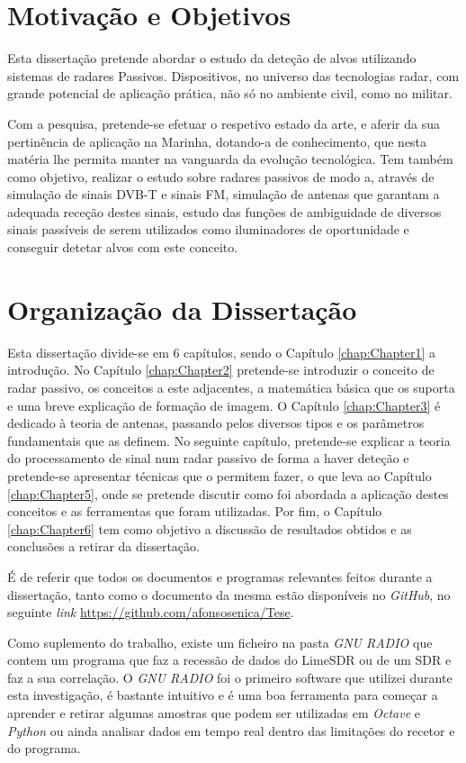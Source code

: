 \section{Motivação e Objetivos}
Esta dissertação pretende abordar o estudo da deteção de alvos utilizando sistemas de radares Passivos. Dispositivos, no universo das tecnologias radar, com grande potencial de aplicação prática, não só no ambiente civil, como no militar.\par
Com a pesquisa, pretende-se efetuar o respetivo estado da arte, e aferir da sua pertinência de aplicação na Marinha, dotando-a de conhecimento, que nesta matéria lhe permita manter na vanguarda da evolução tecnológica. Tem também como objetivo, realizar o estudo sobre radares passivos de modo a, através de simulação de sinais \gls{DVB-T} e sinais \gls{FM}, simulação de antenas que garantam a adequada receção destes sinais, estudo das funções de ambiguidade de diversos sinais passíveis de serem utilizados como iluminadores de oportunidade e conseguir detetar alvos com este conceito. 

\section{Organização da Dissertação}
Esta dissertação divide-se em 6 capítulos, sendo o Capítulo \ref{chap:Chapter1} a introdução. No Capítulo \ref{chap:Chapter2} pretende-se introduzir o conceito de radar passivo, os conceitos a este adjacentes, a matemática básica que os suporta e uma breve explicação de formação de imagem. O Capítulo \ref{chap:Chapter3} é dedicado à teoria de antenas, passando pelos diversos tipos e os parâmetros fundamentais que as definem. No seguinte capítulo, pretende-se explicar a teoria do processamento de sinal num radar passivo de forma a haver deteção e pretende-se apresentar técnicas que o permitem fazer, o que leva ao Capítulo \ref{chap:Chapter5}, onde se pretende discutir como foi abordada a aplicação destes conceitos e as ferramentas que foram utilizadas. Por fim, o Capítulo \ref{chap:Chapter6} tem como objetivo a discussão de resultados obtidos e as conclusões a retirar da dissertação.\par 
É de referir que todos os documentos e programas relevantes feitos durante a dissertação, tanto como o documento da mesma estão disponíveis no \textit{GitHub}, no seguinte \textit{link} \url{https://github.com/afonsosenica/Tese}.\par 
Como suplemento do trabalho, existe um ficheiro na pasta \textit{GNU RADIO} que contem um programa que faz a recessão de dados do LimeSDR ou de um \gls{SDR} e faz a sua correlação. O \textit{GNU RADIO} foi o primeiro software que utilizei durante esta investigação, é bastante intuitivo e é uma boa ferramenta para começar a aprender e retirar algumas amostras que podem ser utilizadas em \textit{Octave} e \textit{Python} ou ainda analisar dados em tempo real dentro das limitações do recetor e do programa.
